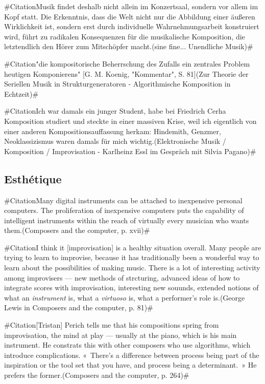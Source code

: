\documentclass[a4paper,12pt]{article}
\newcommand{\guill}[1]{«~#1~»}
\newcommand{\zitat}[2]{\#Citation#1(#2)\#}
\begin{document}
\zitat{Musik findet deshalb nicht allein im Konzertsaal, sondern vor allem im Kopf statt. Die Erkenntnis, dass die Welt nicht nur die Abbildung einer äußeren Wirklichkeit ist, sondern erst durch individuelle Wahrnehmungsarbeit konstruiert wird, führt zu radikalen Konsequenzen für die musikalische Komposition, die letztendlich den Hörer zum Mitschöpfer macht.}
{sine fine... Unendliche Musik}

\zitat{"die kompositorische Beherrschung des Zufalls ein zentrales Problem heutigen Komponierens" [G. M. Koenig, "Kommentar", S. 81]}
{Zur Theorie der Seriellen Musik in Strukturgeneratoren - Algorithmische Komposition in Echtzeit}

\zitat{Ich war damals ein junger Student, habe bei Friedrich Cerha Komposition studiert und steckte in einer massiven Krise, weil ich eigentlich von einer anderen Kompositionsauffassung herkam: Hindemith, Genzmer, Neoklassizismus waren damals für mich wichtig.}
{Elektronische Musik / Komposition / Improvisation - Karlheinz Essl im Gespräch mit Silvia Pagano}

\subsection{Esthétique}

\zitat{Many digital instruments can be attached to inexpensive personal computers. The proliferation of inexpensive computers puts the capability of intelligent instruments within the reach of virtually every musician who wants them.}
{Composers and the computer, p. xvii}

\zitat{I think it [improvisation] is a healthy situation overall. Many people are trying to learn to improvise, because it has traditionally been a wonderful way to learn about the possibilities of making music. There is a lot of interesting activity among improvisers --- new methods of strcturing, advanced ideas of how to integrate scores with improvisation, interesting new souunds, extended notions of what an \emph{instrument} is, what a \emph{virtuoso} is, what a performer's role is.}
{George Lewis in Composers and the computer, p. 81}

\zitat{[Tristan] Perich tells me that his compositions spring from improvisation, the mind at play --- usually at the piano, which is his main instrument. He constrats this with other composers who use algorithms, which introduce complications. \guill{There's a difference between process being part of the inspiration or the tool set that you have, and process being a determinant.} He prefers the former.}
{Composers and the computer, p. 264}
\end{document}
